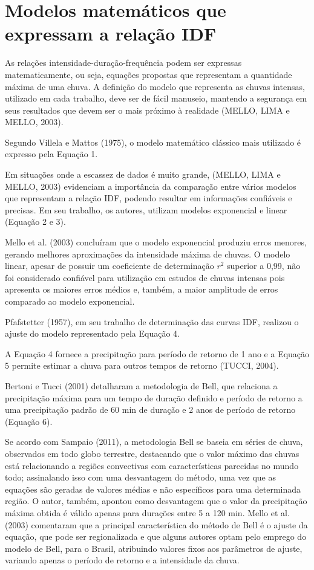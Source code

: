 \section{Modelos matemáticos que expressam a relação IDF}

As relações intensidade-duração-frequência podem ser expressas matematicamente, ou seja, equações propostas que representam a quantidade máxima de uma chuva. A definição do modelo que representa as chuvas intensas, utilizado em cada trabalho, deve ser de fácil manuseio, mantendo a segurança em seus resultados que devem ser o mais próximo à realidade (MELLO, LIMA e MELLO, 2003).

Segundo Villela e Mattos (1975), o modelo matemático clássico mais utilizado é expresso pela Equação 1.

Em situações onde a escassez de dados é muito grande, (MELLO, LIMA e MELLO, 2003) evidenciam a importância da comparação entre vários modelos que representam a relação IDF, podendo resultar em informações confiáveis e precisas. Em seu trabalho, os autores, utilizam modelos exponencial e linear (Equação 2 e 3).

Mello et al. (2003) concluíram que o modelo exponencial produziu erros menores, gerando melhores aproximações da intensidade máxima de chuvas. O modelo linear, apesar de possuir um coeficiente de determinação $r^2$ superior a 0,99, não foi considerado confiável para utilização em estudos de chuvas intensas pois apresenta os maiores erros médios e, também, a maior amplitude de erros comparado ao modelo exponencial.

Pfafstetter (1957), em seu trabalho de determinação das curvas IDF, realizou o ajuste do modelo representado pela Equação 4.

A Equação 4 fornece a precipitação para período de retorno de 1 ano e a Equação 5 permite estimar a chuva para outros tempos de retorno (TUCCI, 2004).

Bertoni e Tucci (2001) detalharam a metodologia de Bell, que relaciona a precipitação máxima para um tempo de duração definido e período de retorno a uma precipitação padrão de 60 min de duração e 2 anos de período de retorno (Equação 6).

Se acordo com Sampaio (2011), a metodologia Bell se baseia em séries de chuva, observados em todo globo terrestre, destacando que o valor máximo das chuvas está relacionando a regiões convectivas com características parecidas no mundo todo; assinalando isso com uma desvantagem do método, uma vez que as equações são geradas de valores médias e não específicos para uma determinada região. O autor, também, apontou como desvantagem que o valor da precipitação máxima obtida é válido apenas para durações entre 5 a 120 min.
Mello et al. (2003) comentaram que a principal característica do método de Bell é o ajuste da equação, que pode ser regionalizada e que alguns autores optam pelo emprego do modelo de Bell, para o Brasil, atribuindo valores fixos aos parâmetros de ajuste, variando apenas o período de retorno e a intensidade da chuva.
    
